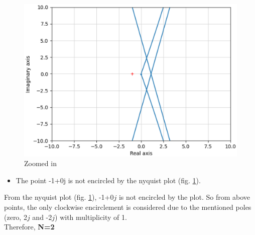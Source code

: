 \begin{figure}[ht!]
    \includegraphics[width=\columnwidth]{./figs/ee18btech11025/g2.eps}
    \caption{Zoomed in}
    \label{fig:nyqplot1}
\end{figure}
\begin{itemize}
    \item The point -1+0j is not encircled by the nyquist plot (fig. \ref{fig:nyqplot1}).
\end{itemize}
From the nyquist plot (fig. \ref{fig:nyqplot1}), -1+0$j$ is not encircled by the plot. 
So from above points, the only clockwise encirclement is considered due to the mentioned poles (zero, 2$j$ and -2$j$)  with multiplicity of 1. \\  
Therefore, \textbf{N=2}

